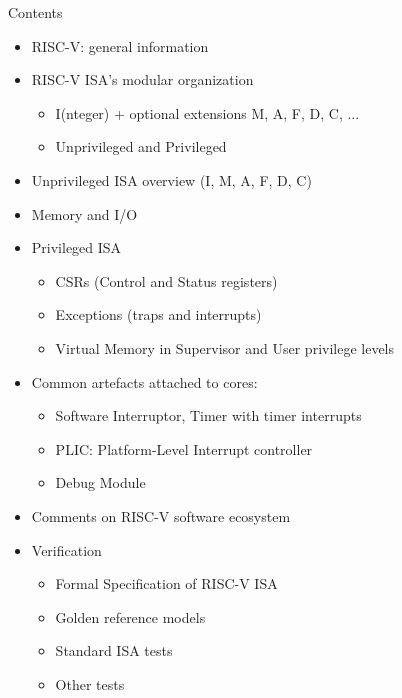 \documentclass{article}
\begin{document}
\begin{center}
  {\Huge Contents}

  \vspace{0.2in}

  \begin{minipage}{6in}\Large
    \begin{itemize}

    \item RISC-V: general information

    \item RISC-V ISA's modular organization
      \begin{itemize}
      \item I(nteger) + optional extensions M, A, F, D, C, ...
      \item Unprivileged and Privileged
      \end{itemize}

    \item Unprivileged ISA overview (I, M, A, F, D, C)

    \item Memory and I/O

    \item Privileged ISA
      \begin{itemize}
      \item CSRs (Control and Status registers)
      \item Exceptions (traps and interrupts)
      \item Virtual Memory in Supervisor and User privilege levels
      \end{itemize}

    \item Common artefacts attached to cores:
      \begin{itemize}
      \item Software Interruptor, Timer with timer interrupts
      \item PLIC: Platform-Level Interrupt controller
      \item Debug Module
      \end{itemize}

    \item Comments on RISC-V software ecosystem

    \item Verification
      \begin{itemize}
      \item Formal Specification of RISC-V ISA
      \item Golden reference models
      \item Standard ISA tests
      \item Other tests
      \end{itemize}
    \end{itemize}
  \end{minipage}
\end{center}
\end{document}
